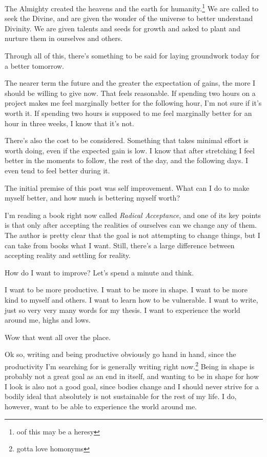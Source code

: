 \documentclass[12pt]{article}[titlepage]
\newcommand{\1}{\={a}}
\newcommand{\2}{\={e}}
\newcommand{\3}{\={\i}}
\newcommand{\4}{\=o}
\newcommand{\5}{\=u}
\newcommand{\6}{\={A}}
\renewcommand{\,}{\textsuperscript{,}}
\begin{document}
The Almighty created the heavens and the earth for humanity.\footnote{oof this may be a heresy}  
We are called to seek the Divine, and are given the wonder of the universe to better understand Divinity.  
We are given talents and seeds for growth and asked to plant and nurture them in ourselves and others.

Through all of this, there's something to be said for laying groundwork today for a better tomorrow.

The nearer term the future and the greater the expectation of gains, the more I should be willing to give now.  
That feels reasonable.  
If spending two hours on a project makes me feel marginally better for the following hour, I'm not sure if it's worth it.  
If spending two hours is supposed to me feel marginally better for an hour in three weeks, I know that it's not.

There's also the cost to be considered.  
Something that takes minimal effort is worth doing, even if the expected gain is low.  
I know that after stretching I feel better in the moments to follow, the rest of the day, and the following days.  
I even tend to feel better during it.

The initial premise of this post was self improvement.  
What can I do to make myself better, and how much is bettering myself worth?

I'm reading a book right now called \textit{Radical Acceptance}, and one of its key points is that only after accepting the realities of ourselves can we change any of them.  
The author is pretty clear that the goal is not attempting to change things, but I can take from books what I want.  
Still, there's a large difference between accepting reality and settling for reality.

How do I want to improve?  
Let's spend a minute and think.

I want to be more productive.  
I want to be more in shape.  
I want to be more kind to myself and others.  
I want to learn how to be vulnerable.  
I want to write, just so very very many words for my thesis.  
I want to experience the world around me, highs and lows.

Wow that went all over the place.

Ok so, writing and being productive obviously go hand in hand, since the productivity I'm searching for is generally writing right now.\footnote{gotta love homonyms}  
Being in shape is probably not a great goal as an end in itself, and wanting to be in shape for how I look is also not a good goal, since bodies change and I should never strive for a bodily ideal that absolutely is not sustainable for the rest of my life.  
I do, however, want to be able to experience the world around me.
\end{document}
